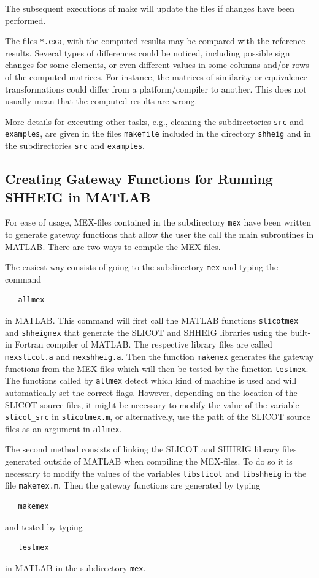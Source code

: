 \documentclass[a4paper,10pt]{article}
\begin{document}
The subsequent executions of make will update the files if changes have been performed.

The files \texttt{*.exa}, with the computed results may be compared with the reference results. Several types of differences could be noticed,
including possible sign changes for some elements, or even different values in some columns and/or rows of the computed matrices. For 
instance, the matrices of similarity or equivalence transformations could differ from a platform/compiler to another. This does not usually mean 
that the computed results are wrong.

More details for executing other tasks, e.g., cleaning the subdirectories \texttt{src} and \texttt{examples}, are given in the files \texttt{makefile} included in the directory \texttt{shheig} and in the subdirectories \texttt{src} and \texttt{examples}.
%
\subsection{Creating Gateway Functions for Running SHHEIG in MATLAB}
%
For ease of usage, MEX-files contained in the subdirectory \texttt{mex} have been written to generate gateway functions that allow the user the call the main subroutines in MATLAB. There are two ways to compile the MEX-files.

The easiest way consists of going to the subdirectory \texttt{mex} and typing the command
\begin{verbatim}
   allmex
\end{verbatim}
in MATLAB. This command will first call the MATLAB functions \texttt{slicotmex} and \texttt{shheigmex} that generate the SLICOT and SHHEIG libraries using the built-in Fortran compiler of MATLAB. The respective library files are called \texttt{mexslicot.a} and \texttt{mexshheig.a}. Then the function \texttt{makemex} generates the gateway functions from the MEX-files which will then be tested by the function \texttt{testmex}. The functions called by \texttt{allmex} detect which kind of machine is used and will automatically set the correct flags. However, depending on the location of the SLICOT source files, it might be necessary to modify the value of the variable \texttt{slicot\_src} in \texttt{slicotmex.m}, or alternatively, use the path of the SLICOT source files as an argument in \texttt{allmex}.

The second method consists of linking the SLICOT and SHHEIG library files generated outside of MATLAB when compiling the MEX-files. To do so it is necessary to modify the values of the variables \texttt{libslicot} and \texttt{libshheig} in the file \texttt{makemex.m}. Then the gateway functions are generated by typing
\begin{verbatim}
   makemex
\end{verbatim}
and tested by typing 
\begin{verbatim}
   testmex
\end{verbatim}
in MATLAB in the subdirectory \texttt{mex}.
%


%
\appendix
%
\end{document}
